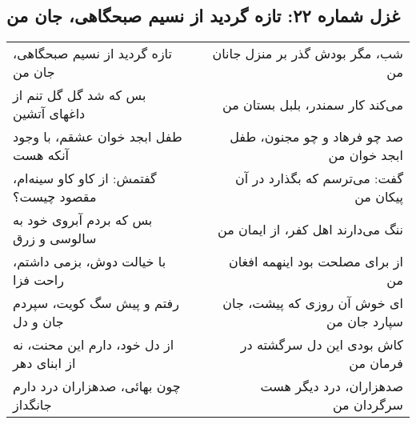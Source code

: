\begin{center}
\section*{غزل شماره ۲۲: تازه گردید از نسیم صبحگاهی، جان من}
\label{sec:022}
\begin{longtable}{l p{0.5cm} r}
تازه گردید از نسیم صبحگاهی، جان من
&&
شب، مگر بودش گذر بر منزل جانان من
\\
بس که شد گل گل تنم از داغهای آتشین
&&
می‌کند کار سمندر، بلبل بستان من
\\
طفل ابجد خوان عشقم، با وجود آنکه هست
&&
صد چو فرهاد و چو مجنون، طفل ابجد خوان من
\\
گفتمش: از کاو کاو سینه‌ام، مقصود چیست؟
&&
گفت: می‌ترسم که بگذارد در آن پیکان من
\\
بس که بردم آبروی خود به سالوسی و زرق
&&
ننگ می‌دارند اهل کفر، از ایمان من
\\
با خیالت دوش، بزمی داشتم، راحت فزا
&&
از برای مصلحت بود اینهمه افغان من
\\
رفتم و پیش سگ کویت، سپردم جان و دل
&&
ای خوش آن روزی که پیشت، جان سپارد جان من
\\
از دل خود، دارم این محنت، نه از ابنای دهر
&&
کاش بودی این دل سرگشته در فرمان من
\\
چون بهائی، صدهزاران درد دارم جانگداز
&&
صدهزاران، درد دیگر هست سرگردان من
\\
\end{longtable}
\end{center}
